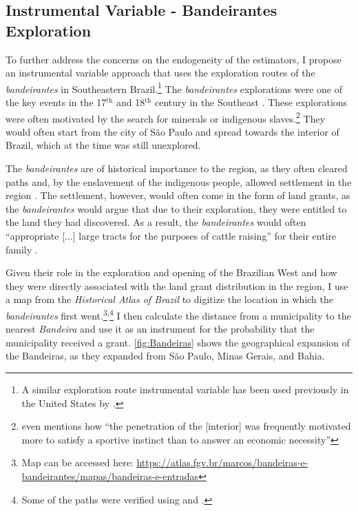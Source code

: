 \documentclass[11pt]{article}
\begin{document}

\subsection{Instrumental Variable - Bandeirantes Exploration}
\label{sec:iv} 

To further address the concerns on the endogeneity of the estimators, I propose an instrumental variable approach that uses the exploration routes of the \textit{bandeirantes} in Southeastern Brazil.\footnote{A similar exploration route instrumental variable has been used previously in the United States by \textcite{Duranton2011-rv}.}
The \textit{bandeirantes} explorations were one of the key events in the 17$^{\text{th}}$ and 18$^\text{th}$ century in the Southeast \parencite[p.~46-47]{Fausto2014-bh}. 
These explorations were often motivated by the search for minerals or indigenous slaves.\footnote{\textcite[p.~142]{Morse1965-kw} even mentions how ``the penetration of the [interior] was frequently motivated more to satisfy a sportive instinct than to answer an economic necessity''}
They would often start from the city of São Paulo and spread towards the interior of Brazil, which at the time was still unexplored.

The \textit{bandeirantes} are of historical importance to the region, as they often cleared paths and, by the enslavement of the indigenous people, allowed settlement in the region \parencite[p.~320]{Smith1972-dv}.
The settlement, however, would often come in the form of land grants, as the \textit{bandeirantes} would argue that due to their exploration, they were entitled to the land they had discovered. 
As a result, the \textit{bandeirantes} would often ``appropriate [...] large tracts for the purposes of cattle raising'' for their entire family \parencite[p.~320]{Smith1972-dv}.

Given their role in the exploration and opening of the Brazilian West and how they were directly associated with the land grant distribution in the region, I use a map from the \textit{Historical Atlas of Brazil} to digitize the location in which the \textit{bandeirantes} first went.\footnote{Map can be accessed here: \url{https://atlas.fgv.br/marcos/bandeiras-e-bandeirantes/mapas/bandeiras-e-entradas}}\textsuperscript{,}\footnote{Some of the paths were verified using \textcite{Santos2022-rv} and \textcite{Cortesao1958-hm}.}
I then calculate the distance from a municipality to the nearest \textit{Bandeira} and use it as an instrument for the probability that the municipality received a grant. \autoref{fig:Bandeiras} shows the geographical expansion of the Bandeiras, as they expanded from São Paulo, Minas Gerais, and Bahia.
\end{document}
